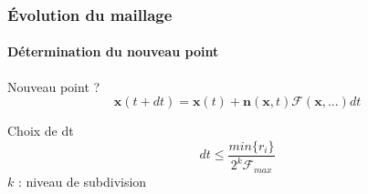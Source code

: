 \documentclass[9pt]{beamer}
\begin{document}
\begin{frame}
	\frametitle{Évolution du maillage}
	\framesubtitle{Détermination du nouveau point}
	
	\begin{block}{Nouveau point ?}
		\begin{equation*}
			\textbf{x}(t + dt) = \textbf{x}(t) + \textbf{n}(\textbf{x}, t) \mathcal{F}(\textbf{x}, ...) dt
		\end{equation*}
	\end{block}
	
	\begin{block}{Choix de dt}
		\begin{equation*}
			dt \le \frac{min\{r_i\}}{2^k \mathcal{F}_{max}}
		\end{equation*}
		$k$ : niveau de subdivision
	\end{block}
\end{frame}
\end{document}
